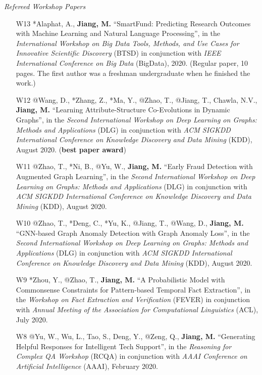 \documentclass[10pt]{article}
\newenvironment{myindentpar}[1]%
{\begin{list}{}%
         {\setlength{\leftmargin}{#1}}%
         \item[]%
}
{\end{list}}
\newcounter{list}
\begin{document}
\begin{myindentpar}{0.00cm}
\hspace{-0.25cm}\textit{Refereed Workshop Papers}

\begin{enumerate}[leftmargin=.5cm]

\item[W13] *Alaphat, A., \textbf{Jiang, M.} ``SmartFund: Predicting Research Outcomes with Machine Learning and Natural Language Processing'', in the \textit{International Workshop on Big Data Tools, Methods, and Use Cases for Innovative Scientific Discovery} (BTSD) in conjunction with \textit{IEEE International Conference on Big Data} (BigData), 2020. (Regular paper, 10 pages. The first author was a freshman undergraduate when he finished the work.)
		
\item[W12] @Wang, D., *Zhang, Z., *Ma, Y., @Zhao, T., @Jiang, T., Chawla, N.V., \textbf{Jiang, M.} ``Learning Attribute-Structure Co-Evolutions in Dynamic Graphs'', in the \textit{Second International Workshop on Deep Learning on Graphs: Methods and Applications} (DLG) in conjunction with \textit{ACM SIGKDD International Conference on Knowledge Discovery and Data Mining} (KDD), August 2020. (\textbf{best paper award})
		
\item[W11] @Zhao, T., *Ni, B., @Yu, W., \textbf{Jiang, M.} ``Early Fraud Detection with Augmented Graph Learning'', in the \textit{Second International Workshop on Deep Learning on Graphs: Methods and Applications} (DLG) in conjunction with \textit{ACM SIGKDD International Conference on Knowledge Discovery and Data Mining} (KDD), August 2020.

\item[W10] @Zhao, T., *Deng, C., *Yu, K., @Jiang, T., @Wang, D., \textbf{Jiang, M.} ``GNN-based Graph Anomaly Detection with Graph Anomaly Loss'', in the \textit{Second International Workshop on Deep Learning on Graphs: Methods and Applications} (DLG) in conjunction with \textit{ACM SIGKDD International Conference on Knowledge Discovery and Data Mining} (KDD), August 2020.

\item[W9] *Zhou, Y., @Zhao, T., \textbf{Jiang, M.} ``A Probabilistic Model with Commonsense Constraints for Pattern-based Temporal Fact Extraction'', in the \textit{Workshop on Fact Extraction and Verification} (FEVER) in conjunction with \textit{Annual Meeting of the Association for Computational Linguistics} (ACL), July 2020.

\item[W8] @Yu, W., Wu, L., Tao, S., Deng, Y., @Zeng, Q., \textbf{Jiang, M.} ``Generating Helpful Responses for Intelligent Tech Support'', in the \textit{Reasoning for Complex QA  Workshop} (RCQA) in conjunction with \textit{AAAI Conference on Artificial Intelligence} (AAAI), February 2020.


\end{enumerate}
\end{myindentpar}
\end{document}
